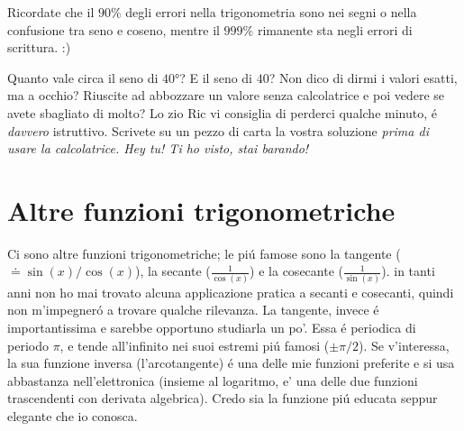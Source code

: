 Ricordate che il $90\%$ degli errori nella trigonometria sono nei segni o nella confusione tra seno e coseno, mentre il $999\%$ rimanente sta negli errori di scrittura. :)

\begin{esercizio}
Quanto vale circa il seno di $\ang{40}$? E il seno di $40$? Non dico di dirmi i valori esatti, ma a occhio? Riuscite ad abbozzare un valore senza calcolatrice
e poi vedere se avete sbagliato di molto? Lo zio Ric vi consiglia di perderci qualche minuto, \'e {\em davvero} istruttivo. Scrivete su un pezzo di carta
la vostra soluzione \em{prima} di usare la calcolatrice. \em{Hey tu! Ti ho visto, stai barando!}
\end{esercizio}


\section{Altre funzioni trigonometriche}

Ci sono altre funzioni trigonometriche; le pi\'u famose sono la tangente ($\doteq \sin(x)/\cos(x)$),
la secante ($\frac{1}{\cos(x)}$) e la cosecante ($\frac{1}{\sin(x)}$). in tanti anni non ho mai trovato alcuna applicazione
pratica a secanti e cosecanti, quindi non m'impegner\'o a trovare qualche rilevanza.
La tangente, invece \'e importantissima e sarebbe opportuno studiarla un po'. Essa \'e periodica di periodo $\pi$, e
tende all'infinito nei suoi estremi pi\'u famosi ($\pm \pi/2$). Se v'interessa, la sua funzione inversa (l'arcotangente)
\'e una delle mie funzioni preferite e si usa abbastanza nell'elettronica (insieme al logaritmo, e' una delle due funzioni trascendenti con derivata algebrica).
Credo sia la funzione pi\'u educata seppur elegante che io conosca.
